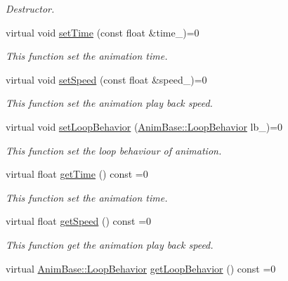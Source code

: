 \begin{DoxyCompactItemize}
\begin{DoxyCompactList}\small\item\em Destructor. \end{DoxyCompactList}\item 
virtual void \hyperlink{class_i_dream_sky_1_1_skeletal_anim_base_a836daad16db0f622b46b03935b3a29b3}{set\+Time} (const float \&time\+\_\+)=0
\begin{DoxyCompactList}\small\item\em This function set the animation time. \end{DoxyCompactList}\item 
virtual void \hyperlink{class_i_dream_sky_1_1_skeletal_anim_base_a8a5fc617483bf51af7b1c196c7678c06}{set\+Speed} (const float \&speed\+\_\+)=0
\begin{DoxyCompactList}\small\item\em This function set the animation play back speed. \end{DoxyCompactList}\item 
virtual void \hyperlink{class_i_dream_sky_1_1_skeletal_anim_base_abfe5574b26b1726311fc351bf9cc0cbc}{set\+Loop\+Behavior} (\hyperlink{class_i_dream_sky_1_1_anim_base_aac1c8b7253df068cf02101dcd4f586e2}{Anim\+Base\+::\+Loop\+Behavior} lb\+\_\+)=0
\begin{DoxyCompactList}\small\item\em This function set the loop behaviour of animation. \end{DoxyCompactList}\item 
virtual float \hyperlink{class_i_dream_sky_1_1_skeletal_anim_base_abdac5a4486d5257eabda7c2dfac178e3}{get\+Time} () const  =0
\begin{DoxyCompactList}\small\item\em This function set the animation time. \end{DoxyCompactList}\item 
virtual float \hyperlink{class_i_dream_sky_1_1_skeletal_anim_base_a8ab8560a9025183331a2ec5813305394}{get\+Speed} () const  =0
\begin{DoxyCompactList}\small\item\em This function get the animation play back speed. \end{DoxyCompactList}\item 
virtual \hyperlink{class_i_dream_sky_1_1_anim_base_aac1c8b7253df068cf02101dcd4f586e2}{Anim\+Base\+::\+Loop\+Behavior} \hyperlink{class_i_dream_sky_1_1_skeletal_anim_base_a035006f39ebbfd043fdaf281a8353d93}{get\+Loop\+Behavior} () const  =0

\end{DoxyCompactItemize}
